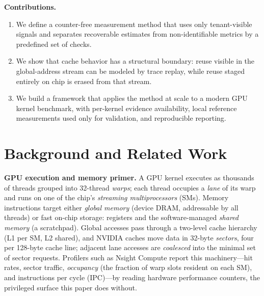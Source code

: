 \documentclass[conference]{IEEEtran}
\begin{document}
\smallskip
\noindent\textbf{Contributions.}
\begin{enumerate}
\item We define a counter-free measurement method that uses only tenant-visible
signals and separates recoverable estimates from non-identifiable metrics by a
predefined set of checks.
\item We show that cache behavior has a structural boundary: reuse visible in
the global-address stream can be modeled by trace replay, while reuse staged
entirely on chip is erased from that stream.
\item We build a framework that applies the method at scale to a modern GPU
kernel benchmark, with per-kernel evidence availability, local reference
measurements used only for validation, and reproducible reporting.
\end{enumerate}

\section{Background and Related Work}
\label{sec:related}

\textbf{GPU execution and memory primer.} A GPU kernel executes as thousands
of threads grouped into 32-thread \emph{warps}; each thread occupies a
\emph{lane} of its warp and runs on one of the chip's \emph{streaming
multiprocessors} (SMs). Memory instructions target either \emph{global memory}
(device DRAM, addressable by all threads) or fast on-chip storage: registers
and the software-managed \emph{shared memory} (a scratchpad). Global accesses
pass through a two-level cache hierarchy (L1 per SM, L2 shared), and NVIDIA
caches move data in 32-byte \emph{sectors}, four per 128-byte cache line;
adjacent lane accesses are \emph{coalesced} into the minimal set of sector
requests. Profilers such as Nsight Compute report this machinery---hit rates,
sector traffic, \emph{occupancy} (the fraction of warp slots resident on each
SM), and instructions per cycle (IPC)---by reading hardware performance
counters, the privileged surface this paper does without.
\end{document}
